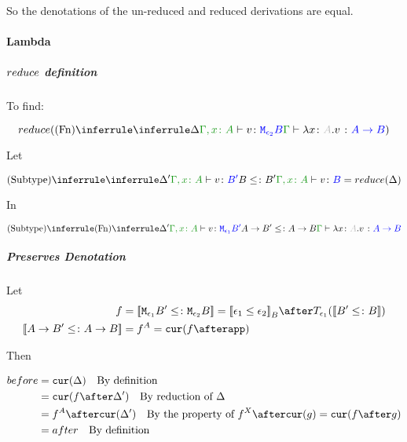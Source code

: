 \documentclass{report}
\begin{document}
        So the denotations of the un-reduced and reduced derivations are equal.

        \paragraph{Lambda}
        \subparagraph{$reduce$ definition}
            To find:
        
            \begin{equation}
                \reduce(\ntreeruleI{Fn}{
                    \treeruleI{\D}{\typerelation{\gax}{v}{\M{\e_2}{B}}}
                }{\gtyperelation{\lam{x}{A}{v}}{\ab}})
            \end{equation}

            Let 

            \begin{equation}
                \ntreeruleII{Subtype}{
                    \treeruleI{\D'}{\typerelation{\gax}{v}{B'}}
                    }{B\subtype B'}{
                    \typerelation{\gax}{v}{B}
                } = \reduce(\D)
            \end{equation}

            In

            \begin{equation}
                \ntreeruleII{Subtype}{
                    \ntreeruleI{Fn}{
                        \D'
                    }{
                        \typerelation{\gax}{v}{\M{\e_1}{B'}}
                    }
                    }{
                    \fntype{A}{B'}\subtype\ab
                } {
                    \gtyperelation{\lam{x}{A}{v}}{\ab}
                }
            \end{equation}

        \subparagraph{Preserves Denotation}
            Let
            \begin{align}
                f &= \deno{\M{\e_1}{B'}\subtype\M{\e_2}{B}} = \deno{\e_1\subeffect\e_2}_B\after\T{\e_1}{(\deno{B'\subtype B})} \\
                \deno{\fntype{A}{B'}\subtype\ab} & = f^A = \cur{f\after \app}
            \end{align}

            Then

            \begin{align}
                before & = \cur{\D} \qt{By definition}\\
                        & = \cur{f\after\D'} \qt{By reduction of $\D$} \\
                        & = f^A\after\cur{\D'}\qt{By the property of $f^X\after\cur{g} = \cur{f\after g}$} \\
                        & = after \qt{By definition}\\
            \end{align}
\end{document}
